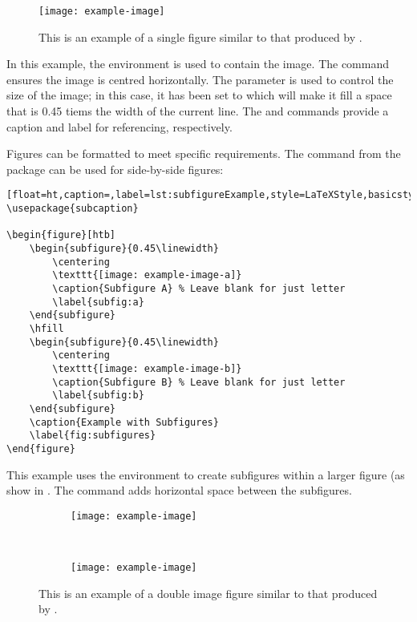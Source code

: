 		\begin{figure}[H]
			\centering
			\texttt{[image: example-image]}
			\caption{This is an example of a single figure similar to that produced by .}
			\label{fig:singleImage}
		\end{figure}

		In this example, the  environment is used to contain the image. 
		The  command ensures the image is centred horizontally. 
		The  parameter is used to control the size of the image; in this case, it has been set to  which will make it fill a space that is 0.45 tiems the width of the current line.
		The  and  commands provide a caption and label for referencing, respectively.

		Figures can be formatted to meet specific requirements. 
		The  command from the  package can be used for side-by-side figures:

		\begin{lstlisting}[float=ht,caption=,label=lst:subfigureExample,style=LaTeXStyle,basicstyle=\small\ttfamily,]
\usepackage{subcaption}

\begin{figure}[htb]
	\begin{subfigure}{0.45\linewidth}
		\centering
		\texttt{[image: example-image-a]}
		\caption{Subfigure A} % Leave blank for just letter
		\label{subfig:a}
	\end{subfigure}
	\hfill
	\begin{subfigure}{0.45\linewidth}
		\centering
		\texttt{[image: example-image-b]}
		\caption{Subfigure B} % Leave blank for just letter
		\label{subfig:b}
	\end{subfigure}
	\caption{Example with Subfigures}
	\label{fig:subfigures}
\end{figure}
		\end{lstlisting}

		This example uses the  environment to create subfigures within a larger figure (as show in . 
		The  command adds horizontal space between the subfigures.

		\begin{figure}[H]
			\centering
			\begin{subfigure}{0.45\linewidth}
				\texttt{[image: example-image]}
				\caption{} %
				\label{fig:doubleImage:a}
			\end{subfigure}
			~
			\begin{subfigure}{0.45\linewidth}
				\texttt{[image: example-image]}
				\caption{} %
				\label{fig:doubleImage:b}
			\end{subfigure}
			\caption{This is an example of a double image figure similar to that produced by .}
			\label{fig:doubleImage}
		\end{figure}

